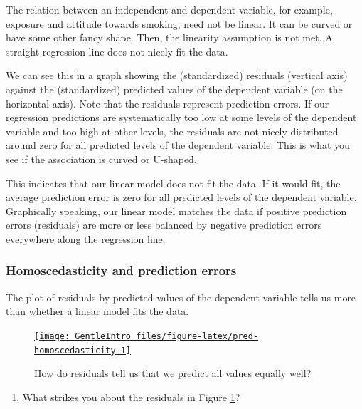 \documentclass[a4paper]{book}
\providecommand{\tightlist}{%
  \setlength{\itemsep}{0pt}\setlength{\parskip}{0pt}}
\theoremstyle{definition}
\theoremstyle{definition}
\theoremstyle{definition}
\theoremstyle{remark}
\begin{document}
The relation between an independent and dependent variable, for example,
exposure and attitude towards smoking, need not be linear. It can be
curved or have some other fancy shape. Then, the linearity assumption is
not met. A straight regression line does not nicely fit the data.

We can see this in a graph showing the (standardized) residuals
(vertical axis) against the (standardized) predicted values of the
dependent variable (on the horizontal axis). Note that the residuals
represent prediction errors. If our regression predictions are
systematically too low at some levels of the dependent variable and too
high at other levels, the residuals are not nicely distributed around
zero for all predicted levels of the dependent variable. This is what
you see if the association is curved or U-shaped.

This indicates that our linear model does not fit the data. If it would
fit, the average prediction error is zero for all predicted levels of
the dependent variable. Graphically speaking, our linear model matches
the data if positive prediction errors (residuals) are more or less
balanced by negative prediction errors everywhere along the regression
line.

\subsubsection{Homoscedasticity and prediction
errors}\label{homoscedasticity-and-prediction-errors}

The plot of residuals by predicted values of the dependent variable
tells us more than whether a linear model fits the data.

\begin{figure}[H]
\href{http://82.196.4.233:3838/apps/pred-homoscedasticity/}{\texttt{[image: GentleIntro\_files/figure-latex/pred-homoscedasticity-1]} }\caption{How do residuals tell us that we predict all values equally well?}\label{fig:pred-homoscedasticity}
\end{figure}

\begin{enumerate}
\def\labelenumi{\arabic{enumi}.}
\tightlist
\item
  What strikes you about the residuals in Figure
  \ref{fig:pred-homoscedasticity}?
\end{enumerate}
\end{document}
